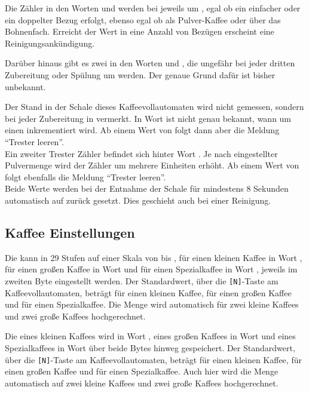 Die Zähler in den Worten  und  werden bei  jeweils um , egal ob ein einfacher oder ein doppelter Bezug erfolgt, ebenso egal ob als Pulver-Kaffee oder über das Bohnenfach.
Erreicht der Wert in  eine Anzahl von  Bezügen erscheint eine Reinigungsankündigung.

Darüber hinaus gibt es zwei  in den Worten  und , die ungefähr bei jeder dritten Zubereitung oder Spülung um  werden.
Der genaue Grund dafür ist bisher unbekannt.

Der  Stand in der Schale dieses Kaffeevollautomaten wird nicht gemessen, sondern bei jeder Zubereitung in  vermerkt.
In Wort  ist nicht genau bekannt, wann um einen inkrementiert wird.
Ab einem Wert von  folgt dann aber die Meldung "`Trester leeren"'.\\
Ein zweiter Trester Zähler befindet sich hinter Wort .
Je nach eingestellter Pulvermenge wird der Zähler um mehrere Einheiten erhöht.
Ab einem Wert von  folgt ebenfalls die Meldung "`Trester leeren"'.\\
Beide Werte werden bei der Entnahme der Schale für mindestens 8 Sekunden automatisch auf  zurück gesetzt.
Dies geschieht auch bei einer Reinigung.

\subsection{Kaffee Einstellungen}
Die  kann in 29 Stufen auf einer Skala von  bis , für einen kleinen Kaffee in Wort , für einen großen Kaffee in Wort  und für einen Spezialkaffee in Wort , jeweils im zweiten Byte eingestellt werden.
Der Standardwert, über die \texttt{[N]}-Taste am Kaffeevollautomaten, beträgt  für einen kleinen Kaffee,  für einen großen Kaffee und  für einen Spezialkaffee.
Die Menge wird automatisch für zwei kleine Kaffees und zwei große Kaffees hochgerechnet.

Die  eines kleinen Kaffees wird in Wort , eines großen Kaffees in Wort  und eines Spezialkaffees in Wort  über beide Bytes hinweg gespeichert.
Der Standardwert, über die \texttt{[N]}-Taste am Kaffeevollautomaten, beträgt  für einen kleinen Kaffee,  für einen großen Kaffee und  für einen Spezialkaffee.
Auch hier wird die Menge automatisch auf zwei kleine Kaffees und zwei große Kaffees hochgerechnet.

